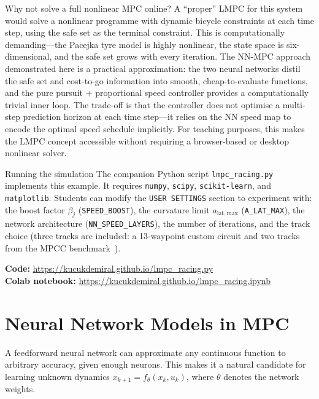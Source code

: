 \begin{alertbox}{Why not solve a full nonlinear MPC online?}
	A ``proper'' LMPC for this system would solve a nonlinear programme with dynamic bicycle constraints at each time step, using the safe set as the terminal constraint. This is computationally demanding---the Pacejka tyre model is highly nonlinear, the state space is six-dimensional, and the safe set grows with every iteration. The NN-MPC approach demonstrated here is a practical approximation: the two neural networks distil the safe set and cost-to-go information into smooth, cheap-to-evaluate functions, and the pure pursuit + proportional speed controller provides a computationally trivial inner loop. The trade-off is that the controller does not optimise a multi-step prediction horizon at each time step---it relies on the NN speed map to encode the optimal speed schedule implicitly. For teaching purposes, this makes the LMPC concept accessible without requiring a browser-based or desktop nonlinear solver.
\end{alertbox}

\begin{notebox}{Running the simulation}
	The companion Python script \texttt{lmpc\_racing.py} implements this example. It requires \texttt{numpy}, \texttt{scipy}, \texttt{scikit-learn}, and \texttt{matplotlib}. Students can modify the \texttt{USER SETTINGS} section to experiment with: the boost factor $\beta_j$ (\texttt{SPEED\_BOOST}), the curvature limit $a_{\mathrm{lat,max}}$ (\texttt{A\_LAT\_MAX}), the network architecture (\texttt{NN\_SPEED\_LAYERS}), the number of iterations, and the track choice (three tracks are included: a 13-waypoint custom circuit and two tracks from the MPCC benchmark~\cite{liniger2015optimization}).

	\medskip
	\textbf{Code:} \url{https://kucukdemiral.github.io/lmpc_racing.py}\\
	\textbf{Colab notebook:} \url{https://kucukdemiral.github.io/lmpc_racing.ipynb}
\end{notebox}


\section{Neural Network Models in MPC}
\label{sec:nnmpc}

A feedforward neural network can approximate any continuous function to arbitrary accuracy, given enough neurons. This makes it a natural candidate for learning unknown dynamics $x_{k+1} = f_\theta(x_k, u_k)$, where $\theta$ denotes the network weights.

